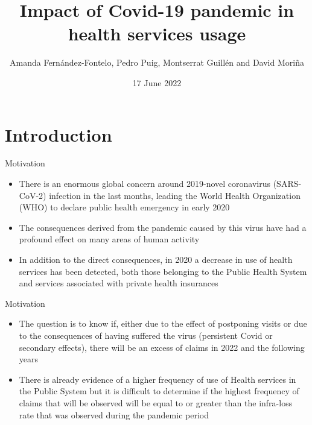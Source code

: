 \documentclass[aspectratio=169,usepdftitle=true]{beamer}
\title{Impact of Covid-19 pandemic in health services usage}
\date{17 June 2022}
\author{Amanda Fern\'andez-Fontelo, Pedro Puig, Montserrat Guill\'en and David Mori\~na}
\begin{document}
\section{Introduction}
\begin{frame}{Motivation}
\begin{itemize}
 \item There is an enormous global concern around 2019-novel coronavirus (SARS-CoV-2)
infection in the last months, leading the World Health Organization (WHO) to declare
public health emergency in early 2020
 \item The consequences derived from the pandemic
caused by this virus have had a profound effect on many areas of human activity
 \item In addition to the direct consequences, in 2020 a decrease in use of health services has been detected, both those
belonging to the Public Health System and services associated with private health
insurances
\end{itemize}
\end{frame}

\begin{frame}{Motivation}
\begin{itemize}
 \item The question is to know if, either due to the effect of
postponing visits or due to the consequences of having suffered the virus (persistent Covid
or secondary effects), there will be an excess of claims in 2022 and the following years
 \item There is already evidence of a higher frequency of use of Health services in the Public
System but it is difficult to determine if the highest frequency of
claims that will be observed will be equal to or greater than the infra-loss rate that was
observed during the pandemic period
\end{itemize}
\end{frame}
\end{document}
